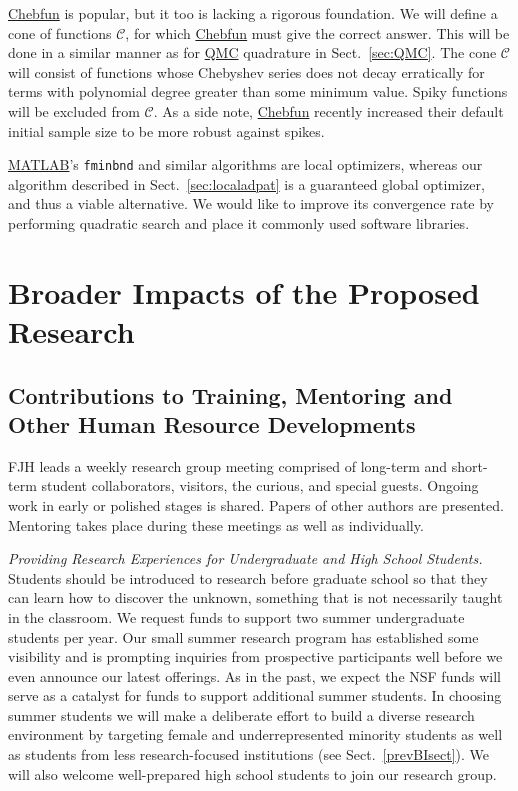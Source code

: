 \documentclass[11pt]{NSFamsart}
\newcommand{\QMC}{\hyperlink{QMClink}{QMC}\xspace}
\newcommand{\MATLAB}{\hyperlink{MATLABlink}{MATLAB}\xspace}
\newcommand{\Chebfun}{\hyperlink{Chebfunlink}{Chebfun}\xspace}
\newcommand{\cc}{\mathcal{C}}
\begin{document}
\Chebfun is popular, but it too is lacking a rigorous foundation.  We will define a cone of functions $\cc$, for which \Chebfun must give the correct answer.  This will be done in a similar manner as for \QMC quadrature in Sect.\ \ref{sec:QMC}.  The cone $\cc$ will consist of functions 
whose Chebyshev series does not decay erratically for terms with polynomial degree greater than 
some minimum value.  Spiky functions will be excluded from $\cc$.  As a side note, \Chebfun recently increased their default initial sample size to be more robust against spikes.

\MATLAB's \texttt{fminbnd} and similar algorithms are local optimizers, whereas our algorithm described in Sect.\ \ref{sec:localadpat} is a guaranteed global optimizer, and thus a viable alternative.  We would like to improve its convergence rate by performing quadratic search and place it commonly used software libraries.

\section{Broader Impacts of the Proposed Research}\label{SectBroad}


\subsection{Contributions to Training, Mentoring and Other Human Resource Developments}
FJH leads a weekly research group meeting comprised of long-term and short-term student 
collaborators, visitors, the curious, and special guests.  Ongoing work in early or polished stages is shared.  Papers of other authors are presented.  Mentoring takes place during these meetings as well as individually.

\emph{Providing Research Experiences for Undergraduate and High School Students.} Students 
should be introduced to research before graduate school so that they can learn how to 
discover the unknown, something that is not necessarily taught in the classroom. We request funds 
to 
support two summer undergraduate students per year.  Our small summer research program has established some visibility 
and is prompting inquiries from prospective participants well before we 
even announce our latest 
offerings. As in the past, we expect the NSF funds will serve as a catalyst for funds to 
support additional summer students. In choosing summer students we will make a deliberate effort to 
build 
a diverse research environment by targeting female and underrepresented minority students as well 
as students from less research-focused institutions (see Sect.~\ref{prevBIsect}). We will also 
welcome well-prepared high school students to join our research group.
\end{document}
